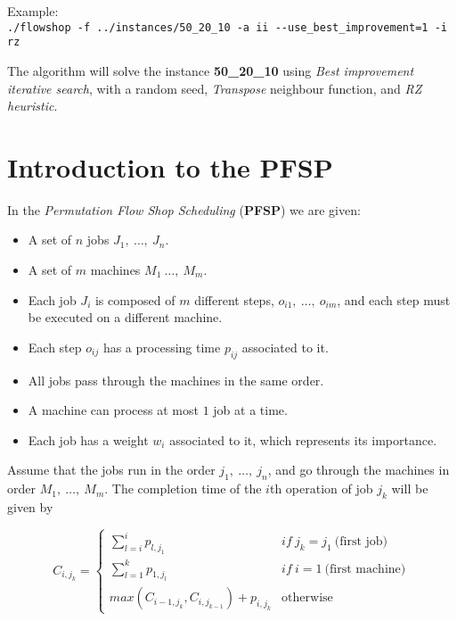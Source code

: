 \documentclass[
12pt,
a4paper,
oneside,
headinclude,
footinclude]{article}
\theoremstyle{definition} %
\begin{document}
Example:\\
\quad\texttt{./flowshop -f ../instances/50\_20\_10 -a ii -{}-use\_best\_improvement=1 -i rz}

The algorithm will solve the instance \textbf{50\_20\_10} using \textit{Best improvement iterative search}, with a random seed, \textit{Transpose} neighbour function, and \textit{RZ heuristic}.






\newpage
\section{Introduction to the PFSP}
In the \textit{Permutation Flow Shop Scheduling} (\textbf{PFSP}) we are given:
\begin{itemize}
    \item A set of $n$ jobs $J_1,\ \ldots,\ J_n$.
    \item A set of $m$ machines $M_1\ \ldots,\ M_m$.
    \item Each job $J_i$ is composed of $m$ different steps, $o_{i1},\ \ldots,\ o_{im}$, and each step must be executed on a different machine.
    \item Each step $o_{ij}$ has a processing time $p_{ij}$ associated to it.
    \item All jobs pass through the machines in the same order.
    \item A machine can process at most $1$ job at a time.
    \item Each job has a weight $w_i$ associated to it, which represents its importance.
\end{itemize}

Assume that the jobs run in the order $j_1,\ \ldots,\ j_n$, and go through the machines in order $M_1,\ \ldots,\ M_m$.
The completion time of the $i$th operation of job $j_k$ will be given by

\[
    C_{i,j_k}=
        \begin{cases}
        \sum_{l=i}^{i}{p_{l,j_1}} & if\ j_k = j_1\ \text{(first job)} \\
        \sum_{l=1}^{k}{p_{1,j_l}} & if\ i = 1\ \text{(first machine)} \\
        max(C_{i-1, j_k}, C_{i, j_{k-1}}) + p_{i,j_k} & \text{otherwise}
        \end{cases}
\]
\end{document}
